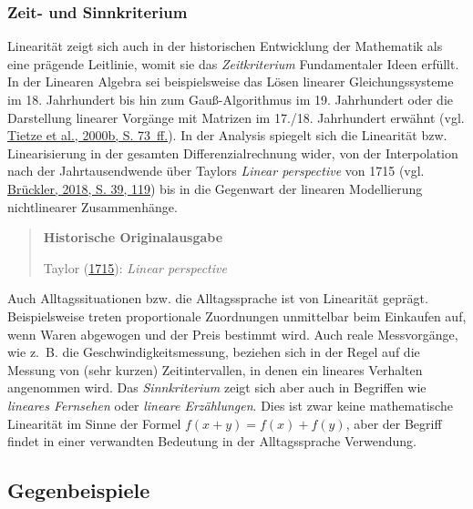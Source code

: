 \documentclass[
]{scrbook}
\theoremstyle{definition}
\theoremstyle{definition}
\theoremstyle{definition}
\theoremstyle{definition}
\theoremstyle{remark}
\begin{document}
\hypertarget{zeit--und-sinnkriterium}{%
\subsubsection{Zeit- und Sinnkriterium}\label{zeit--und-sinnkriterium}}

Linearität zeigt sich auch in der historischen Entwicklung der Mathematik als eine prägende Leitlinie, womit sie das \emph{Zeitkriterium} Fundamentaler Ideen erfüllt. In der Linearen Algebra sei beispielsweise das Lösen linearer Gleichungssysteme im 18. Jahrhundert bis hin zum Gauß-Algorithmus im 19. Jahrhundert oder die Darstellung linearer Vorgänge mit Matrizen im 17./18. Jahrhundert erwähnt (vgl. \protect\hyperlink{ref-Tietze:2000}{Tietze et al., 2000b, S. 73~ff.}). In der Analysis spiegelt sich die Linearität bzw. Linearisierung in der gesamten Differenzialrechnung wider, von der Interpolation nach der Jahrtausendwende über Taylors \emph{Linear perspective} von 1715 (vgl. \protect\hyperlink{ref-Bruckler:2018}{Brückler, 2018, S. 39, 119}) bis in die Gegenwart der linearen Modellierung nichtlinearer Zusammenhänge.

\begin{quote}
\textbf{Historische Originalausgabe}

Taylor (\protect\hyperlink{ref-Taylor:1715}{1715}): \emph{Linear perspective}
\end{quote}

Auch Alltagssituationen bzw. die Alltagssprache ist von Linearität geprägt. Beispielsweise treten proportionale Zuordnungen unmittelbar beim Einkaufen auf, wenn Waren abgewogen und der Preis bestimmt wird. Auch reale Messvorgänge, wie z.~B. die Geschwindigkeitsmessung, beziehen sich in der Regel auf die Messung von (sehr kurzen) Zeitintervallen, in denen ein lineares Verhalten angenommen wird. Das \emph{Sinnkriterium} zeigt sich aber auch in Begriffen wie \emph{lineares Fernsehen} oder \emph{lineare Erzählungen}. Dies ist zwar keine mathematische Linearität im Sinne der Formel \(f(x+y) = f(x) +f(y)\), aber der Begriff findet in einer verwandten Bedeutung in der Alltagssprache Verwendung.

\hypertarget{gegenbeispiele}{%
\subsection{Gegenbeispiele}\label{gegenbeispiele}}
\end{document}
